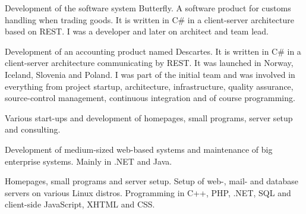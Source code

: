 \documentclass[10pt,a4paper]{altacv}
\begin{document}
\divider

Development of the software system Butterfly. A software product for customs handling when trading goods. It is written in C\# in a client-server architecture based on REST. I was a developer and later on  architect and team lead.

\divider

Development of an accounting product named Descartes. It is written in C\# in a client-server architecture communicating by REST. It was launched in Norway, Iceland, Slovenia and Poland. I was part of the initial team and was involved in everything from project startup, architecture, infrastructure, quality assurance, source-control management, continuous integration and of course programming.

\divider

Various start-ups and development of homepages, small programs, server setup and consulting.

\divider

Development of medium-sized web-based systems and maintenance of big enterprise systems. Mainly in .NET and Java.

\divider

Homepages, small programs and server setup. Setup of web-, mail- and database servers on various Linux distros. Programming in C++, PHP, .NET, SQL and client-side JavaScript, XHTML and CSS.

\clearpage

\end{document}
